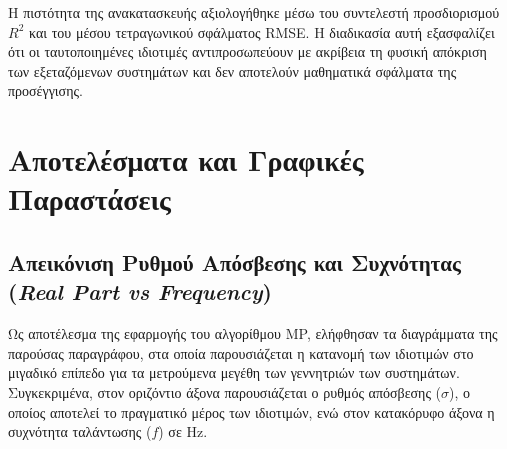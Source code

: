 \documentclass[conference]{IEEEtran}
\begin{document}
Η πιστότητα της ανακατασκευής αξιολογήθηκε μέσω του συντελεστή προσδιορισμού $R^{2}$ και του μέσου τετραγωνικού σφάλματος RMSE. Η διαδικασία αυτή εξασφαλίζει ότι οι ταυτοποιημένες ιδιοτιμές αντιπροσωπεύουν με ακρίβεια τη φυσική απόκριση των εξεταζόμενων συστημάτων και δεν αποτελούν μαθηματικά σφάλματα της προσέγγισης.

\section{Αποτελέσματα και Γραφικές Παραστάσεις}

\subsection{Απεικόνιση Ρυθμού Απόσβεσης και Συχνότητας (\textit{Real Part vs Frequency})}
\label{sec:modal_and_reconstruction_plots}
Ως αποτέλεσμα της εφαρμογής του αλγορίθμου MP, ελήφθησαν τα διαγράμματα της παρούσας παραγράφου, στα οποία παρουσιάζεται η κατανομή των ιδιοτιμών στο μιγαδικό επίπεδο για τα μετρούμενα μεγέθη των γεννητριών των συστημάτων. Συγκεκριμένα, στον οριζόντιο άξονα παρουσιάζεται ο ρυθμός απόσβεσης ($\sigma$), ο οποίος αποτελεί το πραγματικό μέρος των ιδιοτιμών, ενώ στον κατακόρυφο άξονα η συχνότητα ταλάντωσης ($f$) σε Hz.




\end{document}
